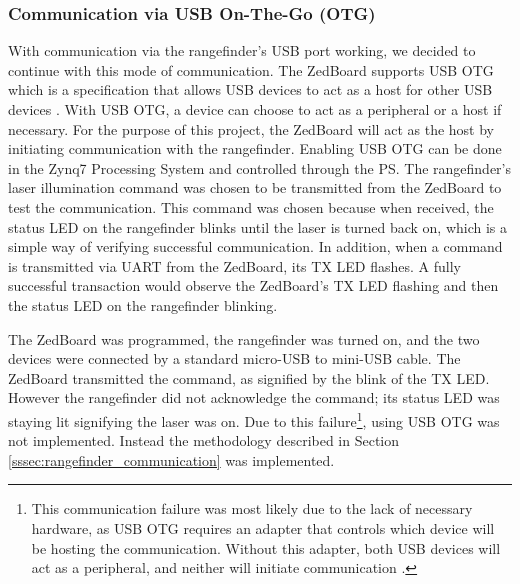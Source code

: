\subsubsection{Communication via USB On-The-Go (OTG)}
With communication via the rangefinder's USB port working, we decided to continue with this mode of communication. The ZedBoard supports USB OTG which is a specification that allows USB devices to act as a host for other USB devices \cite{usb-otg}. With USB OTG, a device can choose to act as a peripheral or a host if necessary. For the purpose of this project, the ZedBoard will act as the host by initiating communication with the rangefinder. Enabling USB OTG can be done in the Zynq7 Processing System and controlled through the PS. The rangefinder's laser illumination command was chosen to be transmitted from the ZedBoard to test the communication. This command was chosen because when received, the status LED on the rangefinder blinks until the laser is turned back on, which is a simple way of verifying successful communication. In addition, when a command is transmitted via UART from the ZedBoard, its TX LED flashes. A fully successful transaction would observe the ZedBoard's TX LED flashing and then the status LED on the rangefinder blinking.
\par
The ZedBoard was programmed, the rangefinder was turned on, and the two devices were connected by a standard micro-USB to mini-USB cable. The ZedBoard transmitted the command, as signified by the blink of the TX LED. However the rangefinder did not acknowledge the command; its status LED was staying lit signifying the laser was on. Due to this failure\footnote{This communication failure was most likely due to the lack of necessary hardware, as USB OTG requires an adapter that controls which device will be hosting the communication. Without this adapter, both USB devices will act as a peripheral, and neither will initiate communication \cite{usb-otg}.}, using USB OTG was not implemented. Instead the methodology described in Section \ref{sssec:rangefinder_communication} was implemented.





